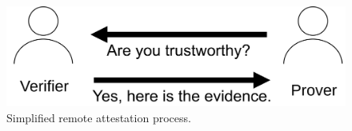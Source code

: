 \begin{figure}[htpb]
  \centering
  \includegraphics[width=0.5\linewidth]{figures/remote_attestation_process.pdf}
  \caption{Simplified remote attestation process.} \label{fig:ra_simple}
\end{figure}
